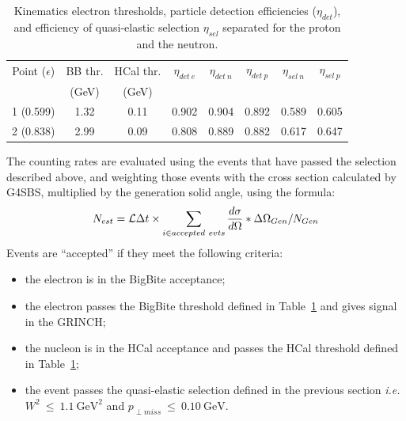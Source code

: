 %
\begin{center}
\begin{table}[h]
\begin{tabular}{|c|c|c|c|c|c|c|c|}
\hline
Point ($\epsilon$) & BB thr. & HCal thr. & $\eta_{det~e}$ & $\eta_{det~n}$ & $\eta_{det~p}$ & $\eta_{sel~n}$ & $\eta_{sel~p}$ \\
 & (GeV) & (GeV) &  &  &  &  &  \\
\hline
1 (0.599) & 1.32 & 0.11 & 0.902 & 0.904 & 0.892 & 0.589 & 0.605 \\ 
\hline
2 (0.838) & 2.99 & 0.09 & 0.808 & 0.889 & 0.882 & 0.617 & 0.647 \\
\hline
\end{tabular} 
\caption{Kinematics electron thresholds, particle detection efficiencies ($\eta_{det}$), and efficiency of quasi-elastic selection $\eta_{sel}$ separated for the proton and the neutron.}
\label{tab:kinEffs}
\end{table}
\end{center}
%

The counting rates are evaluated using the events that have passed the selection described above, and weighting those events with the cross section calculated by G4SBS, multiplied by the generation solid angle, using the formula:
%
\begin{equation}
  N_{est} = {\cal L} \Delta t \times \sum_{i \in accepted~evts} \frac{d\sigma}{d\Omega} *\Delta\Omega_{Gen} /N_{Gen}
\end{equation}
%
Events are ``accepted'' if they meet the following criteria:
%
\begin{itemize}
\item{the electron is in the BigBite acceptance};
\item{the electron passes the BigBite threshold defined in Table~\ref{tab:kinEffs} and gives signal in the GRINCH;}
\item{the nucleon is in the HCal acceptance and passes the HCal threshold defined in Table~\ref{tab:kinEffs};}
\item{the event passes the quasi-elastic selection defined in the previous section {\it i.e.} $W^2~\leq~1.1~\mathrm{GeV}^2$ and $p_{\perp miss}~\leq~0.10~\mathrm{GeV}$.} 
\end{itemize}
%

